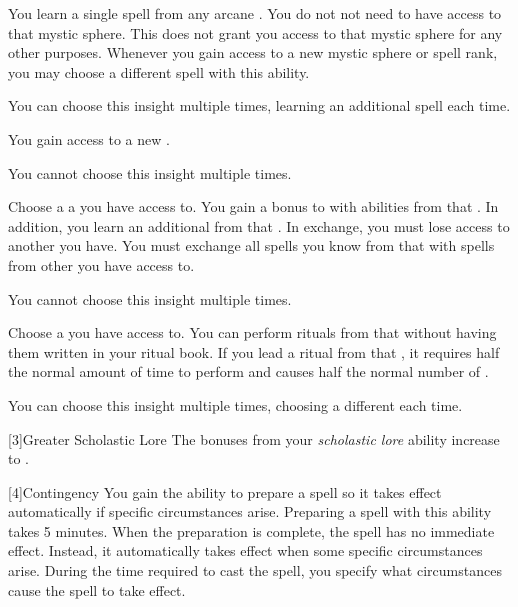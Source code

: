         {
             You learn a single spell from any arcane .
            You do not not need to have access to that mystic sphere.
            This does not grant you access to that mystic sphere for any other purposes.
            Whenever you gain access to a new mystic sphere or spell rank, you may choose a different spell with this ability.
            \par You can choose this insight multiple times, learning an additional spell each time.

             You gain access to a new .
            \par You cannot choose this insight multiple times.

             Choose a a  you have access to.
            You gain a  bonus to  with abilities from that .
            In addition, you learn an additional  from that .
            In exchange, you must lose access to another  you have.
            You must exchange all spells you know from that  with spells from other  you have access to.
            \par You cannot choose this insight multiple times.

            Choose a  you have access to.
            You can perform rituals from that  without having them written in your ritual book.
            If you lead a ritual from that , it requires half the normal amount of time to perform and causes half the normal number of .
            \par You can choose this insight multiple times, choosing a different  each time.
        }

        [3]{Greater Scholastic Lore} The bonuses from your \textit{scholastic lore} ability increase to .

        [4]{Contingency} You gain the ability to prepare a spell so it takes effect automatically if specific circumstances arise.
        Preparing a spell with this ability takes 5 minutes.
        When the preparation is complete, the spell has no immediate effect.
        Instead, it automatically takes effect when some specific circumstances arise.
        During the time required to cast the spell, you specify what circumstances cause the spell to take effect.

